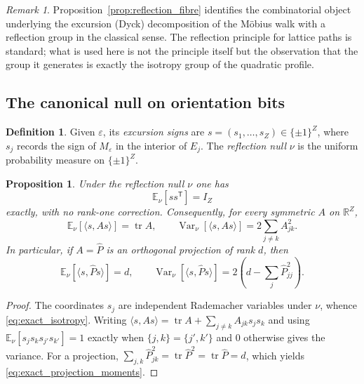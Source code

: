 \documentclass[11pt]{amsart}
\numberwithin{equation}{section}
\theoremstyle{plain}
\newtheorem{proposition}[theorem]{Proposition}
\theoremstyle{definition}
\newtheorem{definition}[theorem]{Definition}
\theoremstyle{remark}
\newtheorem{remark}[theorem]{Remark}
\DeclareMathOperator{\tr}{tr}
\DeclareMathOperator{\Var}{Var}
\begin{document}
\begin{remark}
\label{rem:catalan_link}
Proposition~\ref{prop:reflection_fibre} identifies the combinatorial
object underlying the excursion (Dyck) decomposition of the M\"obius
walk with a reflection group in the classical sense. The reflection
principle for lattice paths is standard; what is used here is not the
principle itself but the observation that the group it generates is
exactly the isotropy group of the quadratic profile.
\end{remark}

\subsection{The canonical null on orientation bits}
\label{subsec:canonical_null}

\begin{definition}
\label{def:excursion_signs}
Given $\varepsilon$, its \emph{excursion signs} are
$s = (s_1,\dots,s_Z) \in \{\pm 1\}^Z$, where $s_j$ records the sign of
$M_\varepsilon$ in the interior of $E_j$. The \emph{reflection null}
$\nu$ is the uniform probability measure on $\{\pm 1\}^Z$.
\end{definition}

\begin{proposition}
\label{prop:exact_isotropy}
Under the reflection null $\nu$ one has
\begin{equation}
\mathbb{E}_\nu\!\left[s s^{\mathsf{T}}\right] = I_Z
\label{eq:exact_isotropy}
\end{equation}
exactly, with no rank-one correction. Consequently, for every symmetric
$A$ on $\mathbb{R}^Z$,
\begin{equation}
\mathbb{E}_\nu\!\left[\langle s, A s\rangle\right] = \tr A,
\qquad
\Var_\nu\!\left[\langle s, A s\rangle\right]
= 2 \sum_{j \neq k} A_{jk}^2 .
\label{eq:exact_mean_variance}
\end{equation}
In particular, if $A = \widehat{P}$ is an orthogonal projection of rank
$d$, then
\begin{equation}
\mathbb{E}_\nu\!\left[\langle s, \widehat{P} s\rangle\right] = d,
\qquad
\Var_\nu\!\left[\langle s, \widehat{P} s\rangle\right]
= 2\left( d - \sum_{j} \widehat{P}_{jj}^2 \right).
\label{eq:exact_projection_moments}
\end{equation}
\end{proposition}

\begin{proof}
The coordinates $s_j$ are independent Rademacher variables under
$\nu$, whence \eqref{eq:exact_isotropy}. Writing
$\langle s, As\rangle = \tr A + \sum_{j \neq k} A_{jk} s_j s_k$ and
using $\mathbb{E}_\nu[s_j s_k s_{j'} s_{k'}] = 1$ exactly when
$\{j,k\} = \{j',k'\}$ and $0$ otherwise gives the variance. For a
projection, $\sum_{j,k}\widehat{P}_{jk}^2 = \tr \widehat{P}^2
= \tr \widehat{P} = d$, which yields
\eqref{eq:exact_projection_moments}.
\end{proof}
\end{document}

